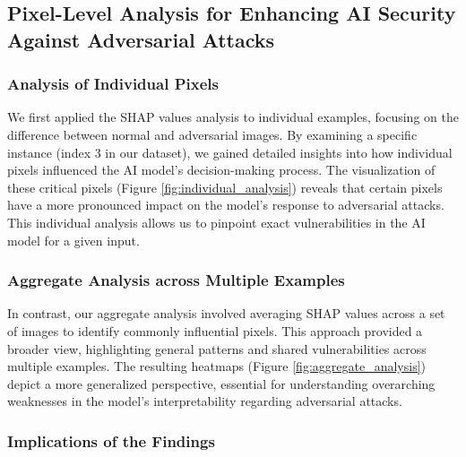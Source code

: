 \documentclass[10pt, conference, a4paper, final]{IEEEtran}
\begin{document}
  \subsection{Pixel-Level Analysis for Enhancing AI Security Against Adversarial Attacks}
  
  \subsubsection{Analysis of Individual Pixels}

  We first applied the SHAP values analysis to individual examples, focusing on the difference between normal 
  and adversarial images. By examining a specific instance (index 3 in our dataset), we gained detailed insights 
  into how individual pixels influenced the AI model's decision-making process. The visualization of these critical pixels (Figure \ref{fig:individual_analysis}) reveals that certain pixels have a more pronounced impact on the model's response to adversarial attacks. This individual analysis allows us to pinpoint exact vulnerabilities in the AI model for a given input.
  
  \subsubsection{Aggregate Analysis across Multiple Examples}
  
  In contrast, our aggregate analysis involved averaging SHAP values across a set of images to identify commonly influential pixels. 
  This approach provided a broader view, highlighting general patterns and shared vulnerabilities across multiple examples.
   The resulting heatmaps (Figure \ref{fig:aggregate_analysis}) depict a more generalized perspective, essential for understanding overarching weaknesses in the model's interpretability regarding adversarial attacks.
  
  \subsubsection{Implications of the Findings}
  
\end{document}
